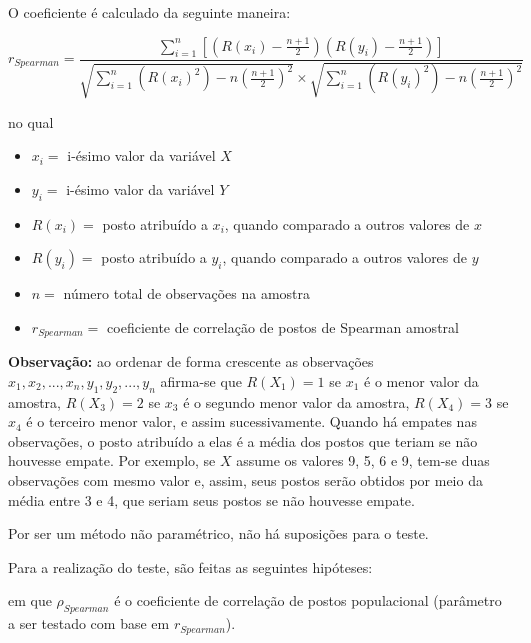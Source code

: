 \documentclass[
  portuguese,
]{estat/estat}
\providecommand{\tightlist}{%
  \setlength{\itemsep}{0pt}\setlength{\parskip}{0pt}}
\begin{document}
O coeficiente é calculado da seguinte maneira:

\[
r_{Spearman} = \frac{ \displaystyle \sum_{i=1}^{n}  \left[\left(R(x_i)-\frac{n+1}{2}\right)\left(R(y_i)-\frac{n+1}{2}\right)\right]}
{\sqrt{\displaystyle \sum_{i=1}^{n}  \left(R(x_i)^2\right)-n\left(\frac{n+1}{2}\right)^{2}}  \times \sqrt{\displaystyle \sum_{i=1}^{n}  \left(R(y_i)^2 \right) -n\left(\frac{n+1}{2}\right)^{2}}}
\]

no qual

\begin{itemize}
\tightlist
\item
  \(x_i=\) i-ésimo valor da variável \(X\)
\item
  \(y_i=\) i-ésimo valor da variável \(Y\)
\item
  \(R(x_i)=\) posto atribuído a \(x_{i}\), quando comparado a outros
  valores de \(x\)
\item
  \(R(y_i)=\) posto atribuído a \(y_{i}\), quando comparado a outros
  valores de \(y\)
\item
  \(n=\) número total de observações na amostra
\item
  \(r_{Spearman}=\) coeficiente de correlação de postos de Spearman
  amostral
\end{itemize}

\textbf{Observação:} ao ordenar de forma crescente as observações
\(x_1,x_2,...,x_n,y_1,y_2,...,y_n\) afirma-se que \(R(X_1)=1\) se
\(x_1\) é o menor valor da amostra, \(R(X_3)=2\) se \(x_3\) é o segundo
menor valor da amostra, \(R(X_4)=3\) se \(x_4\) é o terceiro menor
valor, e assim sucessivamente. Quando há empates nas observações, o
posto atribuído a elas é a média dos postos que teriam se não houvesse
empate. Por exemplo, se \(X\) assume os valores 9, 5, 6 e 9, tem-se duas
observações com mesmo valor e, assim, seus postos serão obtidos por meio
da média entre 3 e 4, que seriam seus postos se não houvesse empate.

Por ser um método não paramétrico, não há suposições para o teste.

Para a realização do teste, são feitas as seguintes hipóteses:


em que \(\rho_{Spearman}\) é o coeficiente de correlação de postos
populacional (parâmetro a ser testado com base em \(r_{Spearman}\)).
\end{document}
